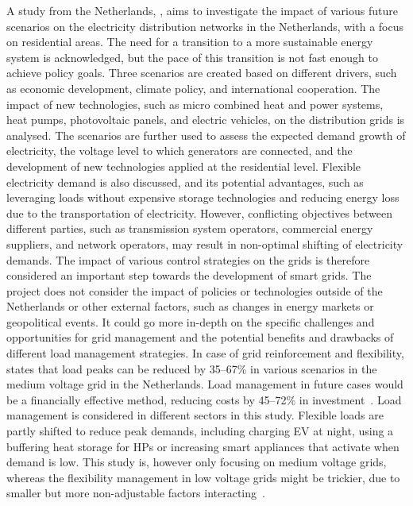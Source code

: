 A study from the Netherlands, \cite{VELDMAN2013233}, aims to investigate the impact of various future scenarios on the electricity distribution networks in the Netherlands, with a focus on residential areas. The need for a transition to a more sustainable energy system is acknowledged, but the pace of this transition is not fast enough to achieve policy goals. Three scenarios are created based on different drivers, such as economic development, climate policy, and international cooperation. The impact of new technologies, such as micro combined heat and power systems, heat pumps, photovoltaic panels, and electric vehicles, on the distribution grids is analysed. The scenarios are further used to assess the expected demand growth of electricity, the voltage level to which generators are connected, and the development of new technologies applied at the residential level. Flexible electricity demand is also discussed, and its potential advantages, such as leveraging loads without expensive storage technologies and reducing energy loss due to the transportation of electricity. However, conflicting objectives between different parties, such as transmission system operators, commercial energy suppliers, and network operators, may result in non-optimal shifting of electricity demands. The impact of various control strategies on the grids is therefore considered an important step towards the development of smart grids. The project does not consider the impact of policies or technologies outside of the Netherlands or other external factors, such as changes in energy markets or geopolitical events. It could go more in-depth on the specific challenges and opportunities for grid management and the potential benefits and drawbacks of different load management strategies. In case of grid reinforcement and flexibility, \cite{VELDMAN2013233} states that load peaks can be reduced by 35–67\% in various scenarios in the medium voltage grid in the Netherlands. Load management in future cases would be a financially effective method, reducing costs by 45–72\% in investment~\cite{VELDMAN2013233}. Load management is considered in different sectors in this study. Flexible loads are partly shifted to reduce peak demands, including charging EV at night, using a buffering heat storage for HPs or increasing smart appliances that activate when demand is low. This study is, however only focusing on medium voltage grids, whereas the flexibility management in low voltage grids might be trickier, due to smaller but more non-adjustable factors interacting~\cite{ior}. 

